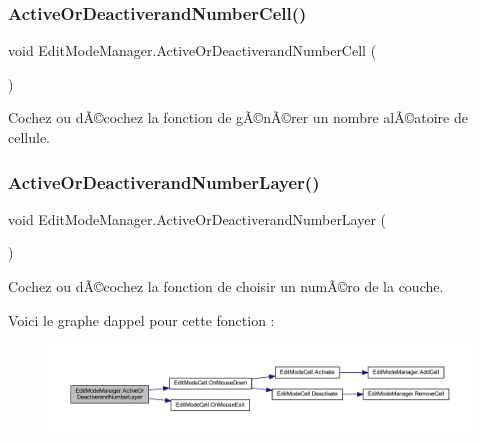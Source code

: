 \subsubsection{\texorpdfstring{Active\+Or\+Deactiverand\+Number\+Cell()}{ActiveOrDeactiverandNumberCell()}}
{\footnotesize\ttfamily void Edit\+Mode\+Manager.\+Active\+Or\+Deactiverand\+Number\+Cell (\begin{DoxyParamCaption}{ }\end{DoxyParamCaption})\hspace{0.3cm}{\ttfamily [inline]}}



Cochez ou dÃ©cochez la fonction de gÃ©nÃ©rer un nombre alÃ©atoire de cellule. 

\mbox{\label{class_edit_mode_manager_ab1048ff448edf1c84b42abb9a811d0ae}} 
\subsubsection{\texorpdfstring{Active\+Or\+Deactiverand\+Number\+Layer()}{ActiveOrDeactiverandNumberLayer()}}
{\footnotesize\ttfamily void Edit\+Mode\+Manager.\+Active\+Or\+Deactiverand\+Number\+Layer (\begin{DoxyParamCaption}{ }\end{DoxyParamCaption})\hspace{0.3cm}{\ttfamily [inline]}}



Cochez ou dÃ©cochez la fonction de choisir un numÃ©ro de la couche. 

Voici le graphe d\textquotesingle{}appel pour cette fonction \+:\nopagebreak
\begin{figure}[H]
\begin{center}
\leavevmode
\includegraphics[width=350pt]{class_edit_mode_manager_ab1048ff448edf1c84b42abb9a811d0ae_cgraph}
\end{center}
\end{figure}
\mbox{\label{class_edit_mode_manager_a9f9fbe57f5bbb6b90dc1dc321d411c54}} 
